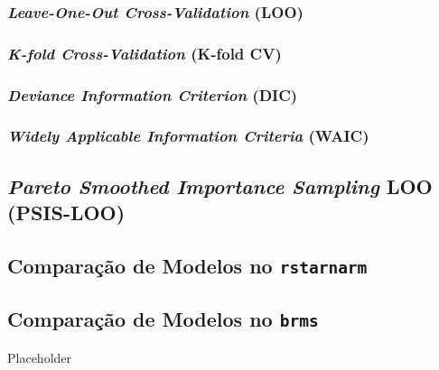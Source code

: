 \subsubsection{\textit{Leave-One-Out Cross-Validation} (LOO)}
\subsubsection{\textit{K-fold Cross-Validation} (K-fold CV)}
\subsubsection{\textit{Deviance Information Criterion} (DIC)}
\subsubsection{\textit{Widely Applicable Information Criteria} (WAIC)}

\subsection{\textit{Pareto Smoothed Importance Sampling} LOO (PSIS-LOO)}

\subsection{Comparação de Modelos no \texttt{rstarnarm}}

\subsection{Comparação de Modelos no \texttt{brms}}
\begin{frame}{Placeholder}

\end{frame}
